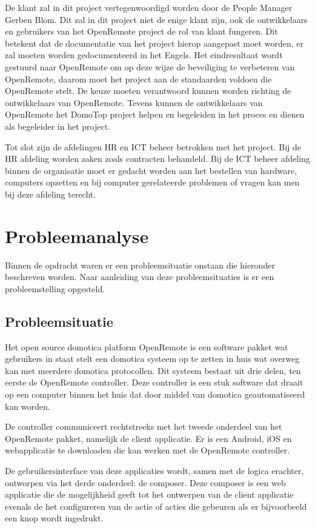 \documentclass[]{article}
\begin{document}
De klant zal in dit project vertegenwoordigd worden door de People Manager
Gerben Blom. Dit zal in dit project niet de enige klant zijn, ook de
ontwikkelaars en gebruikers van het OpenRemote project de rol van klant
fungeren. Dit betekent dat de documentatie van het project hierop aangepast
moet worden, er zal moeten worden gedocumenteerd in het Engels.  
Het eindresultaat wordt gestuurd naar OpenRemote om op deze wijze de beveiliging
te verbeteren van OpenRemote, daarom moet het project aan de standaarden voldoen die OpenRemote stelt. 
De keuze moeten verantwoord kunnen worden richting de ontwikkelaars van
OpenRemote. Tevens kunnen de ontwikkelaars van OpenRemote het DomoTop project helpen en begeleiden
in het proces en dienen als begeleider in het project.

Tot slot zijn de afdelingen HR en ICT beheer betrokken met het project. Bij
de HR afdeling worden zaken zoals contracten behandeld. Bij de ICT beheer
afdeling binnen de organisatie moet er gedacht worden aan het bestellen van
hardware, computers opzetten en bij computer gerelateerde problemen of
vragen kan men bij deze afdeling terecht.

\newpage
\section{Probleemanalyse}
Binnen de opdracht waren er een probleemsituatie onstaan die hieronder
beschreven worden. Naar aanleiding van deze probleemsituaties is er een
probleemstelling opgesteld.

\subsection{Probleemsituatie}

Het open source domotica platform OpenRemote is een software pakket wat
gebruikers in staat stelt een domotica systeem op te zetten in huis wat
overweg kan met meerdere domotica protocollen. Dit systeem bestaat uit drie
delen, ten eerste de OpenRemote controller. Deze controller is een stuk
software dat draait op een computer binnen het huis dat door middel van
domotica geautomatiseerd kan worden.

De controller communiceert rechtstreeks met het tweede onderdeel van het
OpenRemote pakket, namelijk de client applicatie. Er is een Android, iOS en
webapplicatie te downloaden die kan werken met de OpenRemote controller.

De gebruikersinterface van deze applicaties wordt, samen met de logica
erachter, ontworpen via het derde onderdeel: de composer. Deze composer is
een web applicatie die de mogelijkheid geeft tot het ontwerpen van de
client applicatie evenals de het configureren van de actie of acties die
gebeuren als er bijvoorbeeld een knop wordt ingedrukt.
\end{document}
